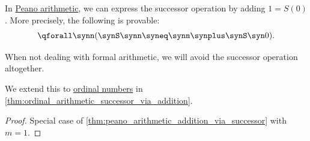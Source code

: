 \begin{corollary}\label{thm:peano_arithmetic_successor_via_addition}
  In \hyperref[def:peano_arithmetic]{Peano arithmetic}, we can express the successor operation by adding \( 1 = S(0) \). More precisely, the following is provable:
  \begin{equation}\label{eq:thm:peano_arithmetic_successor_via_addition}
    \qforall \synn (\synS \synn \syneq \synn \synplus \synS \syn0).
  \end{equation}
\end{corollary}
\begin{comments}
  \item When not dealing with formal arithmetic, we will avoid the successor operation altogether.
  \item We extend this to \hyperref[def:ordinal]{ordinal numbers} in \cref{thm:ordinal_arithmetic_successor_via_addition}.
\end{comments}
\begin{proof}
  Special case of \cref{thm:peano_arithmetic_addition_via_successor} with \( m = 1 \).
\end{proof}

